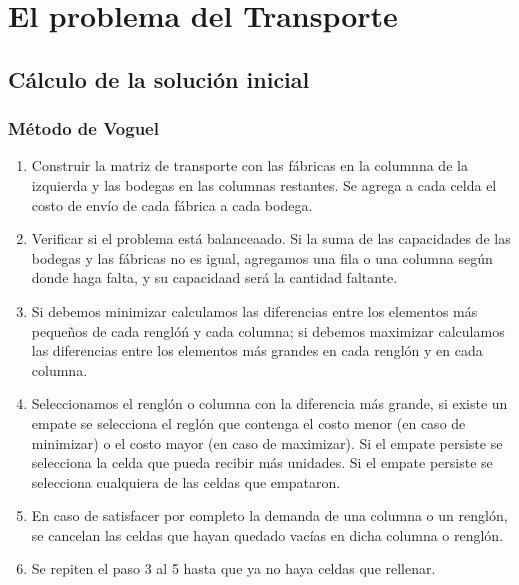 \chapter{El problema del Transporte}
	\section{Cálculo de la solución inicial}
	
	
	\subsection{Método de Voguel}
	
	\begin{enumerate}
		\item Construir la matriz de transporte con las fábricas en la columnna de la izquierda y las bodegas en las columnas restantes. Se agrega a cada celda el costo de envío de cada fábrica a cada bodega.
		
		\item Verificar si el problema está balanceaado. Si la suma de las capacidades de las bodegas y las fábricas no es igual, agregamos una fila o una columna según donde haga falta, y su capacidaad será la cantidad faltante.
		
		\item Si debemos minimizar calculamos las diferencias entre los elementos más pequeños de cada renglóń y cada columna; si debemos maximizar calculamos las diferencias entre los elementos más grandes en cada renglón y en cada columna.
		
		\item Seleccionamos el renglón o columna con la diferencia más grande, si existe un empate se selecciona el reglón que contenga el costo menor (en caso de minimizar) o el costo mayor (en caso de maximizar). Si el empate persiste se selecciona la celda que pueda recibir más unidades. Si el empate persiste se selecciona cualquiera de las celdas que empataron.
		
		\item En caso de satisfacer por completo la demanda de una columna o un renglón, se cancelan las celdas que hayan quedado vacías en dicha columna o renglón.
		
		\item Se repiten el paso 3 al 5 hasta que ya no haya celdas que rellenar.
	\end{enumerate}

